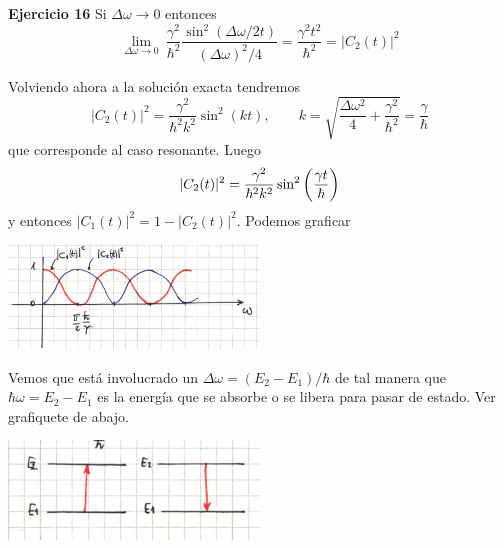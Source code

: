 \documentclass[10pt,oneside]{CBFT_book}
\begin{document}
\begin{ejemplo}{\bf Ejercicio 16}
Si $\Delta \omega \to 0$ entonces
\[
	\lim_{\Delta \omega \to 0} \: \frac{\gamma^2}{\hbar^2}
	\frac{\sin^2(\Delta\omega/2 t)}{ (\Delta\omega)^2 / 4} =
	\frac{\gamma^2 t^2}{\hbar^2} = |C_2(t)|^2
\]

Volviendo ahora a la solución exacta tendremos 
\[
	|C_2(t)|^2 = \frac{\gamma^2}{\hbar^2 k^2}\sin^2( k t ) , 
	\qquad 
	k = \sqrt{ \frac{\Delta\omega^2}{4} + \frac{\gamma^2}{\hbar^2} } 
	= \frac{\gamma}{\hbar}
\]
que corresponde al caso resonante. Luego
\[
	|C_2(t)|^2 = \frac{\gamma^2}{\hbar^2 k^2}\sin^2\left( \frac{ \gamma t }{ \hbar } \right) 
\]
y entonces $ |C_1(t)|^2 = 1 - |C_2(t)|^2 $.
Podemos graficar 

\includegraphics[width=0.5\textwidth]{images/fig_ft2_scattering_section_p2.jpg}
	
Vemos que está involucrado un $\Delta\omega = (E_2 - E_1)/\hbar$ de tal manera
que $\hbar\omega = E_2 - E_1$ es la energía que se absorbe o se libera para
pasar de estado. Ver grafiquete de abajo.
	
\includegraphics[width=0.5\textwidth]{images/fig_ft2_scattering_section_p3.jpg}


\end{ejemplo}


\end{document}
